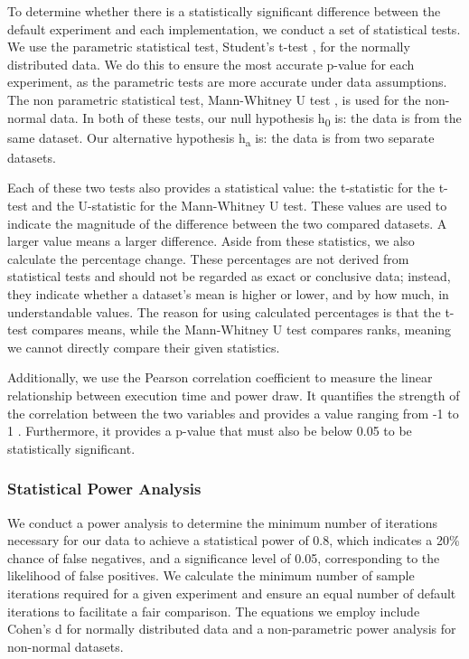 \documentclass[main.tex]{subfiles}
\begin{document}
To determine whether there is a statistically significant difference between the default experiment and each implementation, we conduct a set of statistical tests. We use the parametric statistical test, Student's t-test \cite{student1908}, for the normally distributed data. We do this to ensure the most accurate p-value for each experiment, as the parametric tests are more accurate under data assumptions. The non parametric statistical test, Mann-Whitney U test \cite{mann1947test}, is used for the non-normal data. In both of these tests, our null hypothesis h\textsubscript{0} is: the data is from the same dataset. Our alternative hypothesis h\textsubscript{a} is: the data is from two separate datasets.

Each of these two tests also provides a statistical value: the t-statistic for the t-test and the U-statistic for the Mann-Whitney U test. These values are used to indicate the magnitude of the difference between the two compared datasets. A larger value means a larger difference. Aside from these statistics, we also calculate the percentage change. These percentages are not derived from statistical tests and should not be regarded as exact or conclusive data; instead, they indicate whether a dataset's mean is higher or lower, and by how much, in understandable values. The reason for using calculated percentages is that the t-test compares means, while the Mann-Whitney U test compares ranks, meaning we cannot directly compare their given statistics. 

Additionally, we use the Pearson correlation coefficient to measure the linear relationship between execution time and power draw. It quantifies the strength of the correlation between the two variables and provides a value ranging from -1 to 1 \cite{sedgwick2012pearson}. Furthermore, it provides a p-value that must also be below 0.05 to be statistically significant. 

\subsubsection{Statistical Power Analysis}
We conduct a power analysis to determine the minimum number of iterations necessary for our data to achieve a statistical power of 0.8, which indicates a 20\% chance of false negatives, and a significance level of 0.05, corresponding to the likelihood of false positives. We calculate the minimum number of sample iterations required for a given experiment and ensure an equal number of default iterations to facilitate a fair comparison. The equations we employ include Cohen's d \cite{cohen1988} for normally distributed data and a non-parametric power analysis \cite{noether1987} for non-normal datasets.
 
\end{document}
